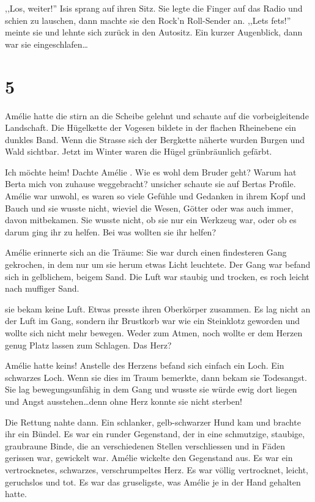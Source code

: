 \documentclass[11pt,titlepage,a5paper]{book}
\newcommand{\am}{Amélie }
\begin{document}
,,Los, weiter!'' Isis sprang auf ihren Sitz. Sie legte die Finger auf das Radio und schien zu lauschen, dann machte sie den Rock'n Roll-Sender an. ,,Lets fets!'' meinte sie und lehnte sich zurück in den Autositz. Ein kurzer Augenblick, dann war sie eingeschlafen\dots

\section*{5}

\am hatte die stirn an die Scheibe gelehnt und schaute auf die vorbeigleitende Landschaft. Die Hügelkette der Vogesen bildete in der flachen Rheinebene ein dunkles Band. Wenn die Strasse sich der Bergkette näherte wurden Burgen und Wald sichtbar. Jetzt im Winter waren die Hügel grünbräunlich gefärbt.

Ich möchte heim! Dachte \am . Wie es wohl dem Bruder geht? Warum hat Berta mich von zuhause weggebracht? unsicher schaute sie auf Bertas Profile. \am war unwohl, es waren so viele Gefühle und Gedanken in ihrem Kopf und  Bauch und sie wusste nicht, wieviel die Wesen, Götter oder was auch immer, davon mitbekamen. Sie wusste nicht, ob sie nur ein Werkzeug war, oder ob es darum ging ihr zu helfen. Bei was wollten sie ihr helfen? 

\am erinnerte sich an die Träume: Sie war durch einen findesteren Gang gekrochen, in dem nur um sie herum etwas Licht leuchtete. Der Gang war befand sich in gelblichem, beigem Sand. Die Luft war staubig und trocken, es roch leicht nach muffiger Sand.

sie bekam keine Luft. Etwas presste ihren Oberkörper zusammen. Es lag nicht an der Luft im Gang, sondern ihr Brustkorb war wie ein Steinklotz geworden und wollte sich nicht mehr bewegen. Weder zum Atmen, noch wollte er dem Herzen genug Platz lassen zum Schlagen. Das Herz? 

\am hatte keins! Anstelle des Herzens befand sich einfach ein Loch. Ein schwarzes Loch. Wenn sie dies im Traum bemerkte, dann bekam sie Todesangst. Sie lag bewegungsunfähig in dem Gang und wusste sie würde ewig dort liegen und Angst ausstehen\dots denn ohne Herz konnte sie nicht sterben!

Die Rettung nahte dann. Ein schlanker, gelb-schwarzer Hund kam und brachte ihr ein Bündel. Es war ein runder Gegenstand, der in eine schmutzige, staubige, graubraune Binde, die an verschiedenen Stellen verschliessen und in Fäden gerissen war, gewickelt war. \am wickelte den Gegenstand aus. Es war ein vertrocknetes, schwarzes, verschrumpeltes Herz. Es war völlig vertrocknet, leicht, geruchslos und tot. Es war das gruseligste, was \am je in der Hand gehalten hatte. 
\end{document}
